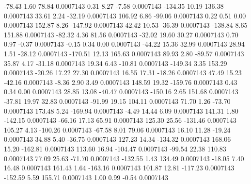       -78.43        1.60       78.84     0.0007143
        0.31        8.27       -7.58     0.0007143
     -134.35       10.19      136.38     0.0007143
       33.61        2.24      -32.19     0.0007143
      106.92        6.86      -99.06     0.0007143
        0.22        0.51        0.00     0.0007143
      152.87        8.26     -147.92     0.0007143
       42.42       10.53      -36.39     0.0007143
     -138.84        8.65      151.88     0.0007143
      -82.32        4.36       81.56     0.0007143
      -32.02       19.60       30.27     0.0007143
        0.70        0.97       -0.37     0.0007143
       -0.15        0.34        0.00     0.0007143
      -44.22       15.36       32.99     0.0007143
       28.94        1.51      -28.12     0.0007143
     -170.51       12.13      165.63     0.0007143
       89.93        2.80      -89.57     0.0007143
       35.87        4.17      -31.18     0.0007143
       19.34        6.43      -10.81     0.0007143
     -149.34        3.35      153.29     0.0007143
      -20.26       17.22       27.30     0.0007143
       16.55       17.31      -18.26     0.0007143
       47.49       15.23      -42.16     0.0007143
       -8.36        2.90        3.49     0.0007143
      148.59       19.32     -159.76     0.0007143
        0.43        0.34        0.00     0.0007143
       28.85       13.08      -40.47     0.0007143
     -150.16        2.65      151.68     0.0007143
      -37.81       19.97       32.83     0.0007143
      -91.99       19.15      104.11     0.0007143
       71.70        1.26      -73.70     0.0007143
      173.48        5.24     -169.94     0.0007143
       -4.49       14.44        6.09     0.0007143
      141.31        1.80     -142.15     0.0007143
      -66.16       17.13       65.91     0.0007143
      125.30       25.56     -131.46     0.0007143
      105.27        4.13     -100.26     0.0007143
      -67.58        8.01       79.06     0.0007143
       16.10       11.28      -19.24     0.0007143
       34.88        5.40      -36.75     0.0007143
      127.23       14.34     -134.32     0.0007143
      168.06       15.20     -162.81     0.0007143
      113.60       16.94     -104.47     0.0007143
      -99.54       22.38      110.83     0.0007143
       77.09       25.63      -71.70     0.0007143
     -132.55        1.43      134.49     0.0007143
      -18.05        7.40       16.48     0.0007143
      161.43        1.64     -163.16     0.0007143
      101.87       12.81     -117.23     0.0007143
     -152.59        5.59      155.71     0.0007143
        1.00        0.99       -0.54     0.0007143
